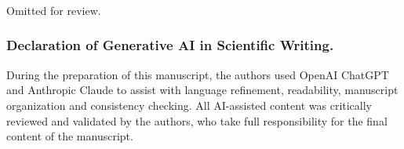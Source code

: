 \documentclass[runningheads]{llncs}
\begin{document}
\begin{credits}
\subsubsection{\ackname}
Omitted for review.
\subsubsection{Declaration of Generative AI in Scientific Writing.}
During the preparation of this manuscript, the authors used OpenAI ChatGPT and Anthropic Claude to assist with language refinement, readability, manuscript organization and consistency checking. All AI-assisted content was critically reviewed and validated by the authors, who take full responsibility for the final content of the manuscript.
\end{credits}



\end{document}
